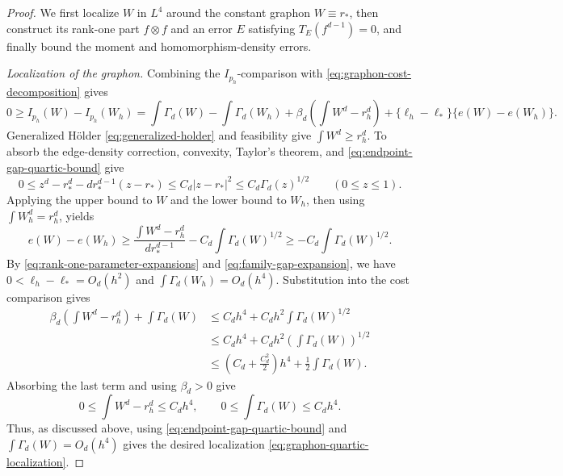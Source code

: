 \begin{proof}
We first localize $W$ in $L^4$ around the constant graphon $W\equiv r_*$,
then construct its rank-one part $f\otimes f$ and an error $E$ satisfying
$T_E(f^{d-1})=0$, and finally bound the moment and homomorphism-density
errors.

\medskip
\noindent\emph{Localization of the graphon.}
Combining the $I_{p_h}$-comparison with \eqref{eq:graphon-cost-decomposition} gives
\[
  0\ge I_{p_h}(W)-I_{p_h}(W_h)
  =\int\Gamma_d(W)-\int\Gamma_d(W_h)
  +\beta_d\left(\int W^d-r_h^d\right)
  +\{\ell_h-\ell_*\}\{e(W)-e(W_h)\}.
\]
Generalized H\"older \eqref{eq:generalized-holder} and feasibility give $\int W^d\ge r_h^d$.
To absorb the edge-density correction, convexity, Taylor's theorem, and
\eqref{eq:endpoint-gap-quartic-bound} give
\[
  0\le z^d-r_*^d-d r_*^{d-1}(z-r_*)
  \le C_d|z-r_*|^2
  \le C_d\Gamma_d(z)^{1/2}
  \qquad(0\le z\le1).
\]
Applying the upper bound to $W$ and the lower bound to $W_h$, then using
$\int W_h^d=r_h^d$, yields
\[
  e(W)-e(W_h)
  \ge\frac{\int W^d-r_h^d}{d r_*^{d-1}}
   -C_d\int\Gamma_d(W)^{1/2}
  \ge-C_d\int\Gamma_d(W)^{1/2}.
\]
By \eqref{eq:rank-one-parameter-expansions} and \eqref{eq:family-gap-expansion},
we have $0<\ell_h-\ell_*=O_d(h^2)$ and $\int\Gamma_d(W_h)=O_d(h^4)$.
Substitution into the cost comparison gives
\begin{align*}
  \beta_d \left(\int W^d-r_h^d\right)+\int\Gamma_d(W)
  &\le C_dh^4+C_dh^2\int\Gamma_d(W)^{1/2}\\
  &\le C_dh^4+C_dh^2\left(\int\Gamma_d(W)\right)^{1/2}\\
  &\le \left(C_d+\frac{C_d^2}{2}\right)h^4+\frac12\int\Gamma_d(W).
\end{align*}
Absorbing the last term and using $\beta_d>0$ give
\begin{equation}\label{eq:moment-and-cost-gap-bounds}
  0\le\int W^d-r_h^d\le C_dh^4,
  \qquad
  0\le\int\Gamma_d(W)\le C_dh^4.
\end{equation}
Thus, as discussed above, using \eqref{eq:endpoint-gap-quartic-bound} and $\int\Gamma_d(W)=O_d(h^4)$
gives the desired localization \eqref{eq:graphon-quartic-localization}.


\end{proof}
